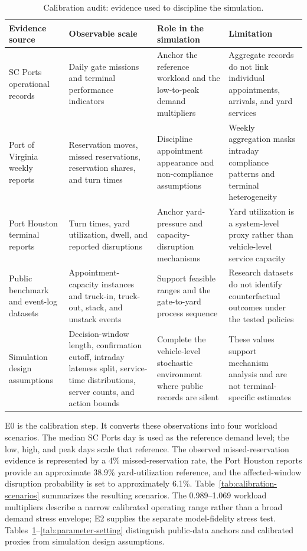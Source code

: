 \documentclass[preprint,12pt,authoryear,a4paper]{elsarticle}
\begin{document}
\begin{table}[htbp]
\centering
\caption{Calibration audit: evidence used to discipline the simulation.}
\label{tab:calibration-audit}
\scriptsize
\renewcommand{\arraystretch}{0.88}
\setlength{\tabcolsep}{3pt}
\begin{tabularx}{\textwidth}{>{\raggedright\arraybackslash}p{2.5cm}>{\raggedright\arraybackslash}p{3.1cm}>{\raggedright\arraybackslash}X>{\raggedright\arraybackslash}X}
\toprule
Evidence source & Observable scale & Role in the simulation & Limitation \tabularnewline
\midrule
SC Ports operational records & Daily gate missions and terminal performance indicators & Anchor the reference workload and the low-to-peak demand multipliers & Aggregate records do not link individual appointments, arrivals, and yard services \tabularnewline
Port of Virginia weekly reports & Reservation moves, missed reservations, reservation shares, and turn times & Discipline appointment appearance and non-compliance assumptions & Weekly aggregation masks intraday compliance patterns and terminal heterogeneity \tabularnewline
Port Houston terminal reports & Turn times, yard utilization, dwell, and reported disruptions & Anchor yard-pressure and capacity-disruption mechanisms & Yard utilization is a system-level proxy rather than vehicle-level service capacity \tabularnewline
Public benchmark and event-log datasets & Appointment-capacity instances and truck-in, truck-out, stack, and unstack events & Support feasible ranges and the gate-to-yard process sequence & Research datasets do not identify counterfactual outcomes under the tested policies \tabularnewline
Simulation design assumptions & Decision-window length, confirmation cutoff, intraday lateness split, service-time distributions, server counts, and action bounds & Complete the vehicle-level stochastic environment where public records are silent & These values support mechanism analysis and are not terminal-specific estimates \tabularnewline
\bottomrule
\end{tabularx}
\end{table}

E0 is the calibration step. It converts these observations into four workload scenarios. The median SC Ports day is used as the reference demand level; the low, high, and peak days scale that reference. The observed missed-reservation evidence is represented by a 4\% missed-reservation rate, the Port Houston reports provide an approximate 38.9\% yard-utilization reference, and the affected-window disruption probability is set to approximately 6.1\%. Table~\ref{tab:calibration-scenarios} summarizes the resulting scenarios. The 0.989--1.069 workload multipliers describe a narrow calibrated operating range rather than a broad demand stress envelope; E2 supplies the separate model-fidelity stress test. Tables~\ref{tab:calibration-audit}--\ref{tab:parameter-setting} distinguish public-data anchors and calibrated proxies from simulation design assumptions.
\end{document}
